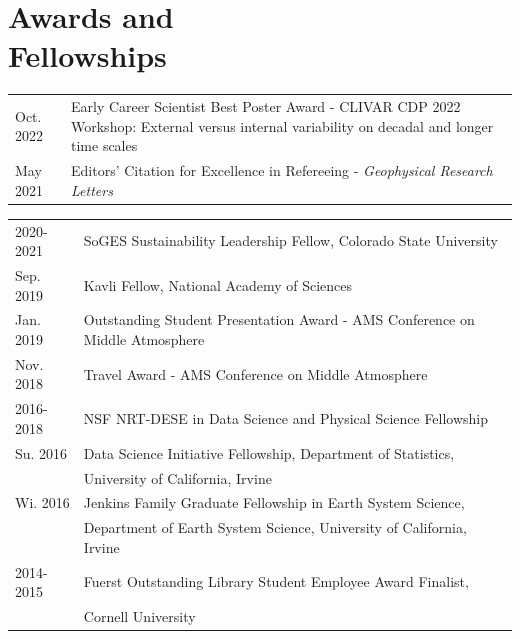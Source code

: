 \documentclass[margin,line,palatino,courier,10pt]{res}
\begin{document}
\begin{resume}
\begin{etaremune}[leftmargin=0in,topsep=0in,parsep=0in]
\end{etaremune}

\vspace{-0.1in}
\noindent\textcolor{Cerulean}{\makebox[\linewidth][r]{\rule{\textwidth}{5pt}}}
\vspace{-0.3in}

\section{\sc \textcolor{Cerulean}{\large{\textbf{Awards and\\ Fellowships}}}}
\begin{tabular}{@{}p{0.9in}p{4in}}
Oct. 2022 & Early Career Scientist Best Poster Award - CLIVAR CDP 2022 Workshop: External versus internal variability on decadal and longer time scales\\
May 2021 & Editors' Citation for Excellence in Refereeing - \textit{Geophysical Research Letters}\\
\end{tabular}
\begin{tabular}{@{}p{0.9in}p{4in}}
2020-2021 & SoGES Sustainability Leadership Fellow, Colorado State University\\
Sep. 2019 & Kavli Fellow, National Academy of Sciences\\
Jan. 2019 & Outstanding Student Presentation Award - AMS Conference on Middle Atmosphere\\
Nov. 2018 & Travel Award - AMS Conference on Middle Atmosphere\\
2016-2018 & NSF NRT-DESE in Data Science and Physical Science Fellowship\\
Su. 2016 & Data Science Initiative Fellowship, Department of Statistics, \\
& University of California, Irvine\\
Wi. 2016 & Jenkins Family Graduate Fellowship in Earth System Science,\\ 
& Department of Earth System
Science, University of California, Irvine\\
2014-2015 & Fuerst Outstanding Library Student Employee Award Finalist,\\
& Cornell University
\end{tabular}



\end{resume}
\end{document}
